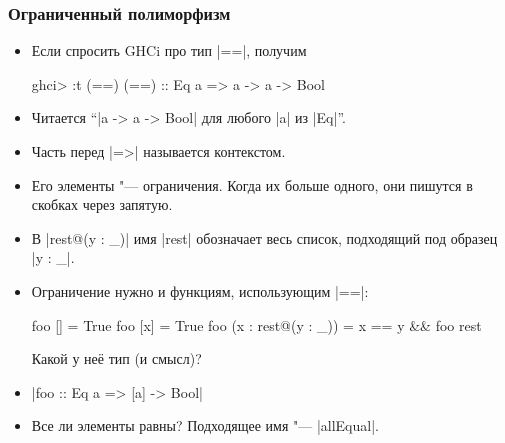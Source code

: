 \documentclass[10pt]{beamer}
\begin{document}
\begin{frame}[fragile]
  \frametitle{Ограниченный полиморфизм}
  \begin{itemize}
    \item Если спросить GHCi про тип \haskinline|==|, получим
          \begin{haskell}
            ghci> :t (==)
            (==) :: Eq a => a -> a -> Bool
          \end{haskell}
    \item Читается \enquote{\haskinline|a -> a -> Bool| для любого \haskinline|a| из \haskinline|Eq|}.
    \item Часть перед \haskinline|=>| называется контекстом.
    \item Его элементы "--- ограничения. Когда их больше одного, они пишутся в скобках через запятую.\pause
    \item В \haskinline|rest@(y : _)| имя \haskinline|rest| обозначает весь список, подходящий под образец \haskinline|y : _|.
    \item Ограничение нужно и функциям, использующим \haskinline|==|:
          \begin{haskell}
            foo [] = True
            foo [x] = True
            foo (x : rest@(y : _)) = x == y && foo rest
          \end{haskell}
          Какой у неё тип (и смысл)? \pause
    \item \haskinline|foo :: Eq a => [a] -> Bool| \pause
    \item Все ли элементы равны? Подходящее имя "--- \haskinline|allEqual|.
  \end{itemize}
\end{frame}
\end{document}
